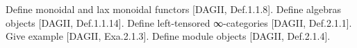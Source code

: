 \documentclass[a4paper]{amsart}
\numberwithin{figure}{section}
\theoremstyle{theorem}
\theoremstyle{definition}
\newcommand{\NN}{\mathbb{N}}
\newcommand{\Top}{\mathrm{Top}}
\begin{document}
%
%
%
%
%
%




Define monoidal and lax monoidal functors [DAGII, Def.1.1.8]. %
Define algebras objects [DAGII, Def.1.1.14]. %
Define left-tensored ∞-categories [DAGII, Def.2.1.1]. %
Give example [DAGII, Exa.2.1.3]. %
Define module objects [DAGII, Def.2.1.4]. %
\end{document}
